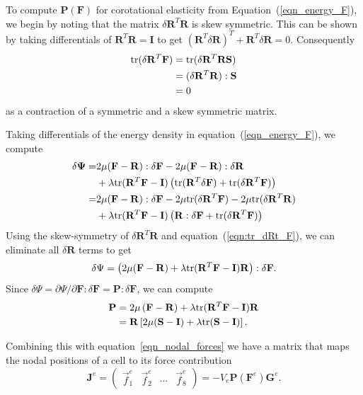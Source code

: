 To compute $\mathbf{P}(\mathbf{F})$ for corotational elasticity from
Equation~(\ref{eqn_energy_F}), we begin by noting that the matrix $\delta\mathbf{R}^T\mathbf{R}$
is skew symmetric.  This can be shown by taking differentials of
$\mathbf{R}^T\mathbf{R}=\mathbf{I}$ to get $(\mathbf{R}^T\!\delta\mathbf{R})^T+\mathbf{R}^T\!\delta\mathbf{R}=0$.
Consequently 
\begin{align}
\mbox{tr}(\delta\mathbf{R}^T\mathbf{F})&=\mbox{tr}(\delta\mathbf{R}^T\mathbf{RS})\nonumber\\
        &=(\delta\mathbf{R}^T\mathbf{R}):\mathbf{S}\nonumber\\
        &=0\label{eqn:tr_dRt_F}
\end{align} 
as a contraction of a
symmetric and a skew symmetric matrix. 

Taking differentials of the energy density in
equation~(\ref{eqn_energy_F}), we compute
\begin{align*}
\delta\mathbf{\Psi} =&
2\mu(\mathbf{F}-\mathbf{R}):\delta\mathbf{F}-2\mu(\mathbf{F}-\mathbf{R}):\delta\mathbf{R}\\
&+\lambda\mbox{tr}(\mathbf{R}^T\mathbf{F}-\mathbf{I})\left(\mbox{tr}(\mathbf{R}^T\delta\mathbf{F})+\mbox{tr}(\delta\mathbf{R}^T\mathbf{F})\right)\\
=&2\mu(\mathbf{F}-\mathbf{R}):\delta\mathbf{F}-2\mu\mbox{tr}(\delta\mathbf{R}^T\mathbf{F})-2\mu\mbox{tr}(\delta\mathbf{R}^T\mathbf{R})\\
 &+\lambda\mbox{tr}(\mathbf{R}^T\mathbf{F}-\mathbf{I})\left(\mathbf{R}:\delta\mathbf{F}+\mbox{tr}(\delta\mathbf{R}^T\mathbf{F})\right)
\end{align*}
Using the skew-symmetry of $\delta\mathbf{R}^T\mathbf{R}$
and equation~(\ref{eqn:tr_dRt_F}), we can eliminate all
$\delta\mathbf{R}$ terms to get
\begin{equation}
\delta\Psi=\left(2\mu(\mathbf{F}-\mathbf{R})+\lambda\mbox{tr}(\mathbf{R}^T\mathbf{F}-\mathbf{I})\mathbf{R}\right):\delta\mathbf{F}.\label{eqn:dPsi}
\end{equation}
Since $\delta\Psi = \partial\Psi/\partial\mathbf{F}:\delta\mathbf{F} = \mathbf{P}:\delta\mathbf{F}$, we can compute 
\begin{align}
\mathbf{P}&=2\mu\left(\mathbf{F}-\mathbf{R}\right) + \lambda \mbox{tr}(\mathbf{R}^T\mathbf{F}-\mathbf{I})\mathbf{R}\nonumber\\
        &=\mathbf{R}\left[2\mu(\mathbf{S}-\mathbf{I})+\lambda \mbox{tr}(\mathbf{S}-\mathbf{I})\right].\label{eqn_piola_stress}
\end{align}


Combining this with equation~\ref{eqn_nodal_forces} we have a matrix
that maps the nodal positions of a cell to its force contribution
\begin{equation}
\mathbf{J}^e
=
\left(
\begin{array}{cccc}
\vec{f}_1^e &
\vec{f}_2^e &
\cdots &
\vec{f}_8^e
\end{array}
\right)
=-V_e\mathbf{P}(\mathbf{F}^e)\mathbf{G}^e.
\label{eqn_cell_forces}
\end{equation}

